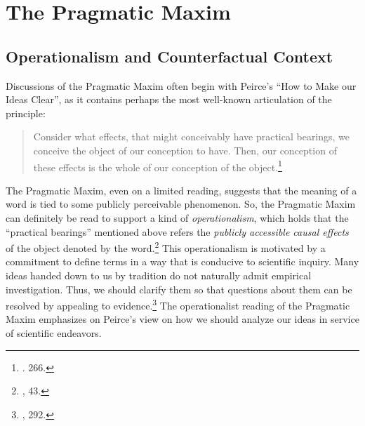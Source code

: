\hypertarget{the-pragmatic-maxim}{%
\section{The Pragmatic Maxim}\label{the-pragmatic-maxim}}

\hypertarget{operationalism-and-counterfactual-context}{%
\subsection{Operationalism and Counterfactual
Context}\label{operationalism-and-counterfactual-context}}

Discussions of the Pragmatic Maxim often begin with Peirce's ``How to
Make our Ideas Clear'', as it contains perhaps the most well-known
articulation of the principle:

\begin{quote}
Consider what effects, that might conceivably have practical bearings,
we conceive the object of our conception to have. Then, our conception
of these effects is the whole of our conception of the object.\footnote{\cite{makeideasclear}. 266.}
\end{quote}

The Pragmatic Maxim, even on a limited reading,  suggests that
the meaning of a word is tied to some publicly perceivable phenomenon. So, the Pragmatic Maxim can definitely be read to support a kind of
\emph{operationalism}, which holds that the ``practical bearings''
mentioned above refers the \emph{publicly accessible causal effects} of the object denoted
by the word.\footnote{\cite{whatpragwas}, 43.} This operationalism is
motivated by a commitment to define terms in a way that is conducive to
scientific inquiry. Many ideas handed down to us by tradition do not
naturally admit empirical investigation. Thus, we should clarify them so
that questions about them can be resolved by appealing to
evidence.\footnote{\cite{hoover1994}, 292.} The operationalist reading of the Pragmatic
Maxim emphasizes on Peirce's view on how we should analyze our ideas in
service of scientific endeavors.

